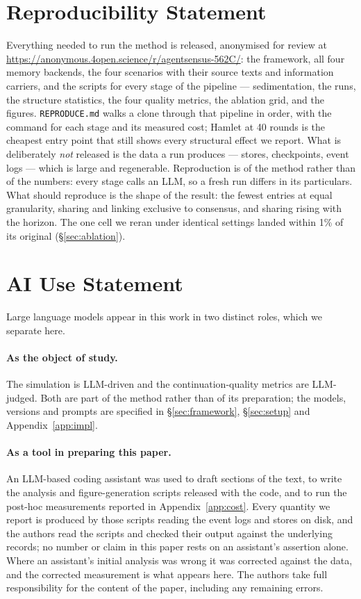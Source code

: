 \documentclass{article}
\begin{document}
\section*{Reproducibility Statement}
Everything needed to run the method is released, anonymised for review at
\url{https://anonymous.4open.science/r/agentsensus-562C/}: the framework,
all four
memory backends, the four scenarios with their source texts and information
carriers, and the scripts for every stage of the pipeline --- sedimentation,
the runs, the structure statistics, the four quality metrics, the ablation
grid, and the figures. \texttt{REPRODUCE.md} walks a clone through that
pipeline in order, with the command for each stage and its measured cost;
Hamlet at 40 rounds is the cheapest entry point that still shows every
structural effect we report. What is deliberately \emph{not} released is the
data a run produces --- stores, checkpoints, event logs --- which is large and
regenerable. Reproduction is of the method rather than of the numbers: every
stage calls an LLM, so a fresh run differs in its particulars. What should
reproduce is the shape of the result: the fewest entries at equal
granularity, sharing and linking exclusive to consensus, and sharing rising
with the horizon. The one cell we reran under identical settings landed
within 1\% of its original (\S\ref{sec:ablation}).

\section*{AI Use Statement}
Large language models appear in this work in two distinct roles, which we
separate here.

\paragraph{As the object of study.} The simulation is LLM-driven and the
continuation-quality metrics are LLM-judged. Both are part of the method
rather than of its preparation; the models, versions and prompts are
specified in \S\ref{sec:framework}, \S\ref{sec:setup} and
Appendix~\ref{app:impl}.

\paragraph{As a tool in preparing this paper.} An LLM-based coding assistant
was used to draft sections of the text, to write the analysis and
figure-generation scripts released with the code, and to run the post-hoc
measurements reported in Appendix~\ref{app:cost}. Every quantity we report is
produced by those scripts reading the event logs and stores on disk, and the
authors read the scripts and checked their output against the underlying
records; no number or claim in this paper rests on an assistant's assertion
alone. Where an assistant's initial analysis was wrong it was corrected
against the data, and the corrected measurement is what appears here. The
authors take full responsibility for the content of the paper, including any
remaining errors.
\end{document}
